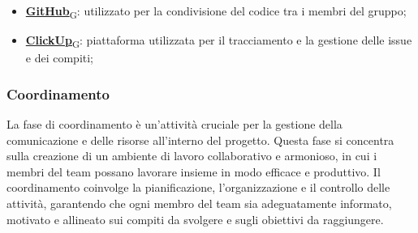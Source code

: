 \begin{itemize}
    \item \href{https://7last.github.io/docs/pb/documentazione-interna/glossario\#github}{\textbf{GitHub}\textsubscript{G}}: utilizzato per la condivisione del codice tra i membri del gruppo;
    \item \href{https://7last.github.io/docs/pb/documentazione-interna/glossario\#clickup}{\textbf{ClickUp}\textsubscript{G}}: piattaforma utilizzata per il tracciamento e la gestione delle issue e dei compiti;
\end{itemize}

\subsubsection{Coordinamento}
La fase di coordinamento è un'attività cruciale per la gestione della comunicazione e delle risorse all'interno del progetto. Questa fase si concentra sulla creazione di un ambiente di lavoro collaborativo e armonioso, in cui i membri del team possano lavorare insieme in modo efficace e produttivo. Il coordinamento coinvolge la pianificazione, l'organizzazione e il controllo delle attività, garantendo che ogni membro del team sia adeguatamente informato, motivato e allineato sui compiti da svolgere e sugli obiettivi da raggiungere. 

